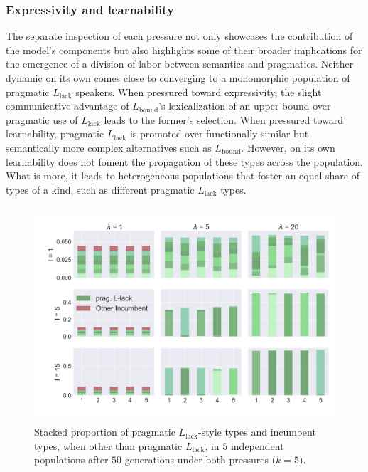 \documentclass[a4paper]{article}
\newcommand{\mylang}[1]{\ensuremath{L_{\text{#1}}}\xspace} %
\newcommand{\Lbound}{\mylang{bound}}
\newcommand{\Llack}{\mylang{lack}}
\begin{document}
\subsubsection{Expressivity and learnability}
The separate inspection of each pressure not only showcases the contribution of the model's components but also highlights some of their broader implications for the emergence of a division of labor between semantics and pragmatics. Neither dynamic on its own comes close to converging to a monomorphic population of pragmatic $\Llack$ speakers. When pressured toward expressivity, the slight communicative advantage of $\Lbound$'s lexicalization of an upper-bound over pragmatic use of $\Llack$ leads to the former's selection. When pressured toward learnability, pragmatic $\Llack$ is promoted over functionally similar but semantically more complex alternatives such as $\Lbound$. However, on its own learnability does not foment the propagation of these types across the population. What is more, it leads to heterogeneous populations that foster an equal share of types of a kind, such as different pragmatic $\Llack$ types.

\begin{figure}
\centering
\includegraphics[width=1\textwidth,height=8cm,keepaspectratio]{./plots/fig3-r+m}
\caption{Stacked proportion of pragmatic $\Llack$-style types and incumbent types, when other than pragmatic $\Llack$, in $5$ independent populations after $50$ generations under both pressures ($k = 5$).}
\label{fig:rmd}
\end{figure}
\end{document}
